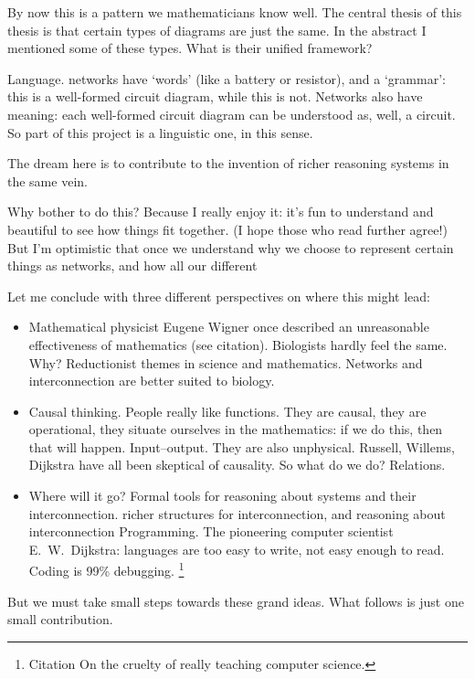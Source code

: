 By now this is a pattern we mathematicians know well. The central thesis of this
thesis is that certain types of diagrams are just the same. In the abstract I
mentioned some of these types. What is their unified framework? 

Language. networks have `words' (like a battery or resistor), and a `grammar':
this is a well-formed circuit diagram, while this is not. Networks also have
meaning: each well-formed circuit diagram can be understood as, well, a circuit.
So part of this project is a linguistic one, in this sense.

The dream here is to contribute to the invention of richer reasoning systems in
the same vein.

Why bother to do this? Because I really enjoy it: it's fun to understand and
beautiful to see how things fit together. (I hope those who read further agree!)
But I'm optimistic that once we understand why we choose to represent certain
things as networks, and how all our different 

Let me conclude with three different perspectives on where this might lead:

\begin{itemize}
  \item Mathematical physicist Eugene Wigner once described an unreasonable effectiveness of mathematics (see
citation). Biologists hardly feel the same.
Why? Reductionist themes in science and mathematics. Networks and interconnection are better suited to biology.

\item Causal thinking. 
People really like functions. They are causal, they are operational, they situate ourselves in the mathematics: if we do this, then that will happen. Input--output. They are also unphysical. Russell, Willems, Dijkstra have all been skeptical of causality. So what do we do? Relations.

\item Where will it go? Formal tools for reasoning about systems and their
  interconnection.  richer structures for interconnection, and reasoning about
  interconnection Programming. The pioneering computer scientist E.\ W.\
  Dijkstra: languages are too easy to write, not easy enough to read. Coding is
  99\% debugging. \footnote{Citation On the cruelty of really teaching computer
  science.}
\end{itemize}

But we must take small steps towards these grand ideas. What follows is just one
small contribution.

